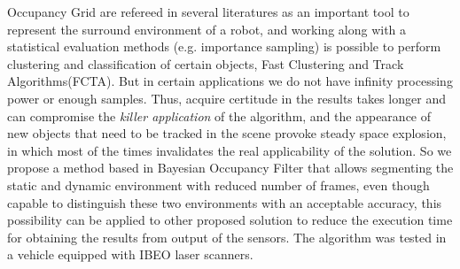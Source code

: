 Occupancy Grid are refereed in several literatures as an important tool to represent the surround environment of a robot, and working along with a statistical evaluation methods (e.g. importance sampling) is possible to perform clustering and classification of certain objects, Fast Clustering and Track Algorithms(FCTA). But in certain applications we do not have infinity processing power or enough samples. Thus, acquire certitude in the results takes longer and can compromise the \textit{killer application} of the algorithm, and the appearance of new objects that need to be tracked in the scene provoke steady space explosion, in which most of the times invalidates the real applicability of the solution. So we propose a method based in Bayesian Occupancy Filter that allows segmenting the static and dynamic environment with reduced number of frames, even though capable to distinguish these two environments with an acceptable accuracy, this possibility can be applied to other proposed solution to reduce the execution time for obtaining the results from output of the sensors. The algorithm was tested in a vehicle equipped with IBEO laser scanners.






